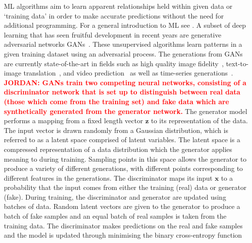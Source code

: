 \documentclass[12pt]{iopart}
\newcommand{\jordan}[1]{\textbf{\textcolor{red}{JORDAN: #1}}}
\begin{document}
%
%
\ac{ML} algorithms aim to learn apparent relationships held within given data or `training
data' in order to make accurate predictions without the need for additional
programming. For a general introduction to \ac{ML} see \cite{Goodfellow-et-al-2016}. A subset of deep learning that has seen fruitful development in recent years
are generative adversarial networks \acp{GAN}~\cite{Goodfellow2014}. These unsupervised algorithms learn patterns in a
given training dataset using an adversarial process. The generations from
\acp{GAN} are currently state-of-the-art in fields such as high quality image
fidelity~\cite{brock2018large,karras2019analyzing}, text-to-image
translation~\cite{reed2016generative}, and video
prediction~\cite{liang2017dual} as well as time-series
generations~\cite{esteban2017realvalued}.
%
%
\jordan{\acp{GAN} train two competing neural networks, consisting of a discriminator
network that is set up to distinguish between real data (those which come from the training set) and fake data which are synthetically generated from the generator network.} The generator model performs a mapping from a fixed length vector $\mathbf{z}$ to its
representation of the data. The input vector is drawn randomly from a Gaussian distribution, which is referred to as a latent space comprised of latent variables. The latent space is a compressed representation of a data distribution which the generator applies meaning to during training. Sampling points in this space allows the generator to produce a variety of different generations, with different points corresponding to different features in the generations. The discriminator maps its input $\mathbf{x}$ to a probability that the input comes from either the training (real) data or
generator (fake).
%
%
During training, the discriminator and generator are updated using batches of data. Random latent vectors are given to the generator to produce a batch of fake samples and an equal batch of real samples is taken from the training data. The discriminator makes predictions on the real and fake samples and the model is updated through minimising the binary cross-entropy function \cite{Goodfellow-et-al-2016}
\end{document}
